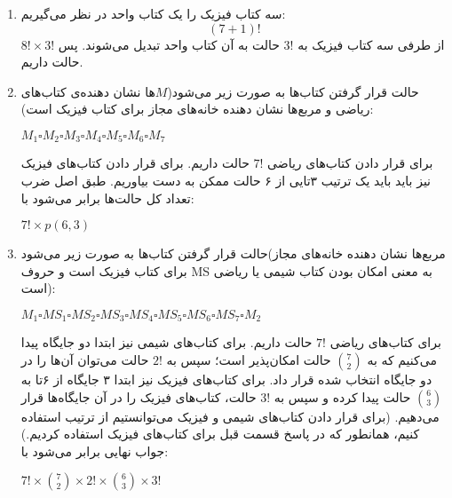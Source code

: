 \begin{enumerate}
  \item 
        سه کتاب فیزیک را یک کتاب واحد در نظر می‌گیریم:
        $$(7+1)!$$
        از طرفی سه کتاب فیزیک به 
        $3!$ حالت به آن کتاب واحد تبدیل می‌شوند. پس 
        $8!\times3!$ حالت داریم.

  \item
        حالت قرار گرفتن کتاب‌ها به صورت زیر می‌شود($M$‌ها نشان دهنده‌ی کتاب‌های ریاضی و مربع‌ها نشان دهنده خانه‌های مجاز برای کتاب فیزیک است):
        \begin{center}
        $M_{1}\square M_{2}\square M_{3}\square M_{4}\square M_{5}\square M_{6}\square M_{7}$
        \end{center}
        برای قرار دادن کتاب‌های ریاضی
        $7!$ 
        حالت داریم. برای قرار دادن کتاب‌های فیزیک نیز باید باید یک ترتیب ۳‌تایی از ۶ حالت ممکن به دست بیاوریم. طبق اصل ضرب تعداد کل حالت‌ها برابر می‌‌شود با:
        \begin{center}
            $7! \times p(6,3)$
        \end{center}

  \item 
        حالت قرار گرفتن کتاب‌ها به صورت زیر می‌شود(مربع‌ها نشان دهنده خانه‌های مجاز برای کتاب فیزیک است و حروف MS به معنی امکان بودن کتاب شیمی یا ریاضی است):
        \begin{center}
        $M_{1}\square MS_{1}\square MS_{2}\square MS_{3}\square MS_{4}\square MS_{5}\square MS_{6}\square MS_{7}\square M_{2}$
        \end{center}
        برای کتاب‌‌های ریاضی
        $7!$
        حالت داریم. برای کتاب‌های شیمی نیز ابتدا دو جایگاه پیدا می‌کنیم که به 
        ${7\choose 2}$
        حالت امکان‌پذیر است؛ سپس به
        $2!$
        حالت می‌توان آن‌ها را در دو جایگاه انتخاب شده قرار داد. برای کتاب‌های فیزیک نیز ابتدا ۳ جایگاه از ۶‌تا به 
        ${6\choose 3}$
        حالت پیدا کرده و سپس به 
        $3!$
        حالت، کتاب‌های فیزیک را در آن جایگاه‌ها قرار می‌دهیم. (برای قرار دادن کتاب‌های شیمی و فیزیک می‌توانستیم از ترتیب استفاده کنیم، همانطور که در پاسخ قسمت قبل برای کتاب‌های فیزیک استفاده کردیم.) جواب نهایی برابر می‌شود با:
        \begin{center}
        $7! \times {7\choose 2}\times 2!\times {6\choose 3}\times 3!$
        \end{center}
\end{enumerate}